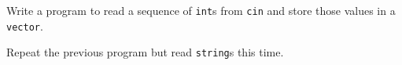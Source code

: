 %
%
\begin{question}
Write a program to read a sequence of \verb|int|s from \verb|cin| and
store those values in a \verb|vector|.
\end{question}

\begin{question}
Repeat the previous program but read \verb|string|s this time.
\end{question}
